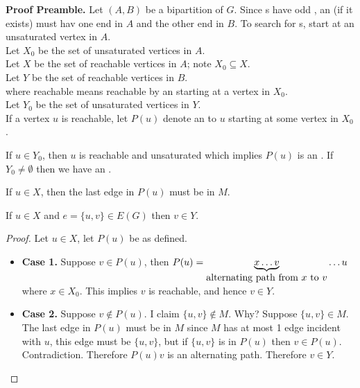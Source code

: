 \documentclass[english, 11pt]{article}
\begin{document}
  \textbf{Proof Preamble.} Let $(A,B)$ be a bipartition of $G$. Since s have odd , an  (if it exists) must hav one end in $A$ and the other end in $B$. To search for s, start at an unsaturated vertex in $A$. \\
  Let $X_0$ be the set of unsaturated vertices in $A$. \\
  Let $X$ be the set of reachable vertices in $A$; note $X_0 \subseteq X$. \\
  Let $Y$ be the set of reachable vertices in $B$. \\
  where reachable means reachable by an  starting at a vertex in $X_0$. \\
  Let $Y_0$ be the set of unsaturated vertices in $Y$. \\

  If a vertex $u$ is reachable, let $P(u)$ denote an  to $u$ starting at some vertex in $X_0$.
  \begin{center}
  \end{center}
  \begin{note}
    If $u \in Y_0$, then $u$ is reachable and unsaturated which implies $P(u)$ is an . If $Y_0 \not = \emptyset$ then we have an .
  \end{note}

  \begin{note}
    If $u \in X$, then the last edge in $P(u)$ must be in $M$.
  \end{note}

  \begin{lem}
    If $u \in X$ and $e = \{u,v\} \in E(G)$ then $v \in Y$.
  \end{lem}
  \begin{proof}
    Let $u \in X$, let $P(u)$ be as defined.
    \begin{itemize}
      \item \textbf{Case 1.} Suppose $v \in P(u)$, then $P(u) = \underbrace{x\ldots v}_{\mbox{alternating path from $x$ to $v$}} \ldots u$ where $x \in X_0$. This implies $v$ is reachable, and hence $v \in Y$.
      \item \textbf{Case 2.} Suppose $v \not \in P(u)$. I claim $\{u,v\} \not \in M$. Why? Suppose $\{u,v\} \in M$. The last edge in $P(u)$ must be in $M$ since $M$ has at most 1 edge incident with $u$, this edge must be $\{u,v\}$, but if $\{u,v\}$ is in $P(u)$ then $v \in P(u)$. Contradiction. Therefore $P(u)v$ is an alternating path. Therefore $v \in Y$.
    \end{itemize}
  \end{proof}
\end{document}
